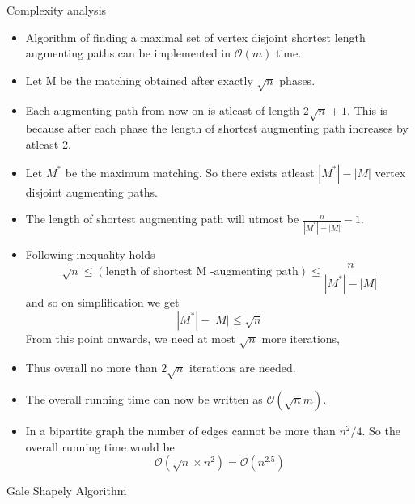 \documentclass[11pt]{beamer}
\theoremstyle{definition}
\begin{document}
\begin{frame}{Complexity analysis}
\begin{itemize}


\item Algorithm of finding a maximal set of vertex disjoint shortest length augmenting paths can be implemented in $\mathcal{O}(m)$ time.
\item Let M be the matching obtained after exactly $\sqrt{n}$ phases.
\item Each augmenting path from now on is atleast of length $2\sqrt{n}+1$. This is because after each phase the length of shortest augmenting path increases by atleast 2.
\item Let $M^*$ be the maximum matching. So there exists atleast $|M^*|-|M|$ vertex disjoint augmenting paths. 
\item The length of shortest augmenting path will utmost be $\frac{n}{|M^*|-|M|} -1$.
\end{itemize}
\end{frame}

\begin{frame}
\begin{itemize}

\item Following inequality holds $$\sqrt{n} \leq (\mbox{length of shortest M -augmenting path})\leq\frac{n}{|M^*|-|M|}$$
and so on simplification we get $$|M^*| - |M | \leq \sqrt{n}$$
From this point onwards, we need at most $\sqrt{n}$ more iterations,
\item Thus overall no more than $2\sqrt{n}$ iterations are needed.
\item The overall running time can now be written as $\mathcal{O}(\sqrt{n}m)$.
\item In a bipartite graph the number of edges cannot be more than $n^2/4$. So the overall running time would be $$\mathcal{O}(\sqrt{n}\times n^2) = \mathcal{O}(n^{2.5})$$
\end{itemize}
\end{frame}

\begin{frame}
\begin{center}
\huge{Gale Shapely Algorithm}
\end{center}
\end{frame}
\end{document}
